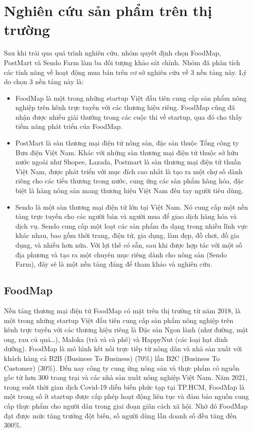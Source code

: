\section{Nghiên cứu sản phẩm trên thị trường}
\quad Sau khi trải qua quá trình nghiên cứu, nhóm quyết định chọn FoodMap, PostMart và Sendo Farm làm ba đối tượng khảo sát chính. Nhóm đã phân tích các tính năng về hoạt động mua bán trên cơ sở nghiên cứu về 3 nền tảng này.
Lý do chọn 3 nền tảng này là:
\begin{itemize}
    \item FoodMap là một trong những startup Việt đầu tiên cung cấp sản phẩm nông nghiệp trên kênh trực tuyến với các thương hiệu riêng. FoodMap cũng đã nhận được nhiều giải thưởng trong các cuộc thi về startup, qua đó cho thấy tiềm năng phát triển của FoodMap.
    \item PostMart là sàn thương mại điện tử nông sản, đặc sản thuộc Tổng công ty Bưu điện Việt Nam. Khác với những sàn thương mại điện tử thuộc sở hữu nước ngoài như Shopee, Lazada, Postmart là sàn thương mại điện tử thuần Việt Nam, được phát triển với mục đích cao nhất là tạo ra một chợ số dành riêng cho các tiểu thương trong nước, cung ứng các sản phẩm hàng hóa, đặc biệt là hàng nông sản mang thương hiệu Việt Nam đến tay người tiêu dùng.
    \item Sendo là một sàn thương mại điện tử lớn tại Việt Nam. Nó cung cấp một nền tảng trực tuyến cho các người bán và người mua để giao dịch hàng hóa và dịch vụ. Sendo cung cấp một loạt các sản phẩm đa dạng trong nhiều lĩnh vực khác nhau, bao gồm thời trang, điện tử, gia dụng, làm đẹp, đồ chơi, đồ gia dụng, và nhiều hơn nữa. Với lợi thế có sẵn, sau khi được hợp tác với một số địa phương và tạo ra một chuyên mục riêng dành cho nông sản (Sendo Farm), đây sẽ là một nền tảng đáng để tham khảo và nghiên cứu.
\end{itemize}
\subsection{FoodMap}
\quad Nền tảng thương mại điện tử FoodMap có mặt trên thị trường từ năm 2018, là một trong những startup Việt đầu tiên cung cấp sản phẩm nông nghiệp trên kênh trực tuyến với các thương hiệu riêng là Đặc sản Ngon lành (như đường, mật ong, rau củ quả…), Maloka (trà và cà phê) và HappyNut (các loại hạt dinh dưỡng). FoodMap là mô hình kết nối trực tiếp từ nông dân và nhà sản xuất với khách hàng cả B2B (Business To Business) (70\%) lẫn B2C (Business To Customer) (30\%). Đến nay công ty cung ứng nông sản và thực phẩm có nguồn gốc từ hơn 300 trang trại và các nhà sản xuất nông nghiệp Việt Nam. Năm 2021, trong suốt thời gian dịch Covid-19 diễn biến phức tạp tại TP.HCM, FoodMap là một trong số ít startup được cấp phép hoạt động liên tục và đảm bảo nguồn cung cấp thực phẩm cho người dân trong giai đoạn giãn cách xã hội. Nhờ đó FoodMap đạt được mức tăng trưởng đột biến, số người dùng lẫn doanh số đều tăng đến 300\%.

